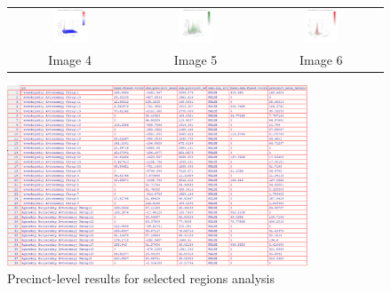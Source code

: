 \documentclass{article}
\begin{document}
\begin{figure}[h]
\centering
\begin{tabular}{ccc}
\includegraphics[width=0.3\textwidth]{inst/figures/img_3Dm_4.png} &
\includegraphics[width=0.3\textwidth]{inst/figures/img_3Dm_5.png} &
\includegraphics[width=0.3\textwidth]{inst/figures/img_3Dm_6.png} \\
Image 4 & Image 5 & Image 6 \\
\end{tabular}
\end{figure}

\begin{figure}[h]
\centering
\includegraphics[width=0.8\textwidth]{inst/figures/EFT_table4.png}
\caption{Precinct-level results for selected regions analysis}
\end{figure}
\end{document}
